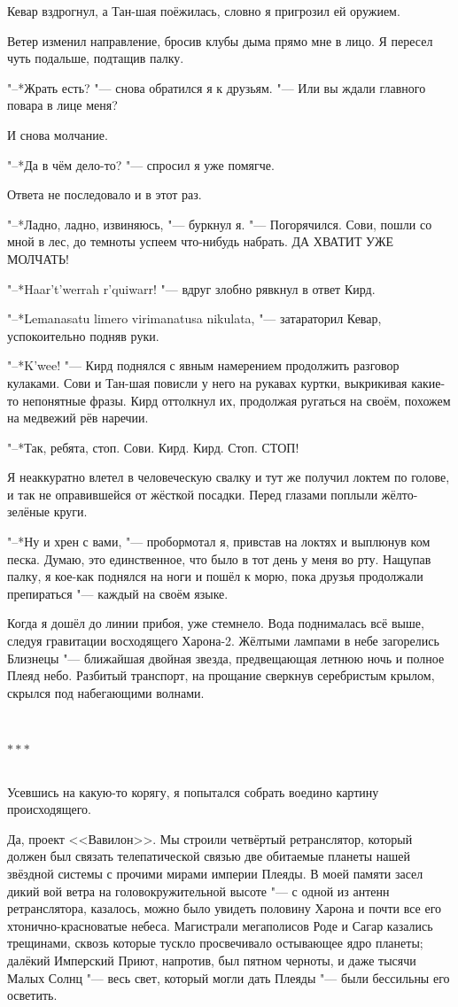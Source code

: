 \documentclass[a4paper,12pt,fleqn]{book}
\newcommand{\razd}{~\\{\centering\Large\bfseries$\ast \ast \ast$\par}~\\}
\begin{document}
Кевар вздрогнул, а Тан-шая поёжилась, словно я пригрозил ей оружием.

Ветер изменил направление, бросив клубы дыма прямо мне в лицо.
Я пересел чуть подальше, подтащив палку.

"--*Жрать есть? "--- снова обратился я к друзьям.
"--- Или вы ждали главного повара в лице меня?

И снова молчание.

"--*Да в чём дело-то? "--- спросил я уже помягче.

Ответа не последовало и в этот раз.

"--*Ладно, ладно, извиняюсь, "--- буркнул я.
"--- Погорячился.
Сови, пошли со мной в лес, до темноты успеем что-нибудь набрать.
ДА ХВАТИТ УЖЕ МОЛЧАТЬ!

"--*Haar't'werrah r'quiwarr! "--- вдруг злобно рявкнул в ответ Кирд.

"--*Lemanasatu limero virimanatusa nikulata, "--- затараторил Кевар, успокоительно подняв руки.

"--*K'wee! "--- Кирд поднялся с явным намерением продолжить разговор кулаками. 
Сови и Тан-шая повисли у него на рукавах куртки, выкрикивая какие-то непонятные фразы.
Кирд оттолкнул их, продолжая ругаться на своём, похожем на медвежий рёв наречии.

"--*Так, ребята, стоп.
Сови.
Кирд.
Кирд.
Стоп.
СТОП!

Я неаккуратно влетел в человеческую свалку и тут же получил локтем по голове, и так не оправившейся от жёсткой посадки.
Перед глазами поплыли жёлто-зелёные круги.

"--*Ну и хрен с вами, "--- пробормотал я, привстав на локтях и выплюнув ком песка.
Думаю, это единственное, что было в тот день у меня во рту.
Нащупав палку, я кое-как поднялся на ноги и пошёл к морю, пока друзья продолжали препираться "--- каждый на своём языке.

Когда я дошёл до линии прибоя, уже стемнело.
Вода поднималась всё выше, следуя гравитации восходящего Харона-2.
Жёлтыми лампами в небе загорелись Близнецы "--- ближайшая двойная звезда, предвещающая летнюю ночь и полное Плеяд небо.
Разбитый транспорт, на прощание сверкнув серебристым крылом, скрылся под набегающими волнами.

\razd

Усевшись на какую-то корягу, я попытался собрать воедино картину происходящего.

Да, проект <<Вавилон>>.
Мы строили четвёртый ретранслятор, который должен был связать телепатической связью две обитаемые планеты нашей звёздной системы с прочими мирами империи Плеяды.
В моей памяти засел дикий вой ветра на головокружительной высоте "--- с одной из антенн ретранслятора, казалось, можно было увидеть половину Харона и почти все его хтонично-красноватые небеса.
Магистрали мегаполисов Роде и Сагар казались трещинами, сквозь которые тускло просвечивало остывающее ядро планеты;
далёкий Имперский Приют, напротив, был пятном черноты, и даже тысячи Малых Солнц "--- весь свет, который могли дать Плеяды "--- были бессильны его осветить.
\end{document}
